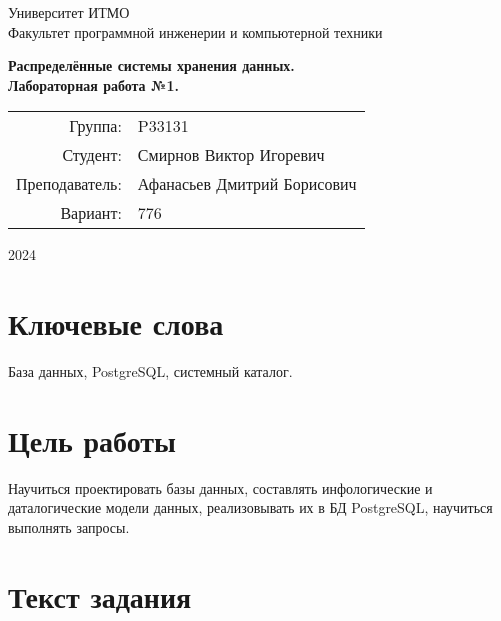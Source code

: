 \documentclass{article}
\begin{document}
\begin{titlepage}
    \begin{center}
        \begin{spacing}{1.4}
            \large{Университет ИТМО} \\
            \large{Факультет программной инженерии и компьютерной техники} \\
        \end{spacing}
        \vfill
        \textbf{
            \huge{Распределённые системы хранения данных.} \\
            \huge{Лабораторная работа №1.} \\
        }
    \end{center}
    \vfill
    \begin{center}
        \begin{tabular}{r l}
            Группа:        & P33131                      \\
            Студент:       & Смирнов Виктор Игоревич     \\
            Преподаватель: & Афанасьев Дмитрий Борисович \\
            Вариант:       & 776                         \\
        \end{tabular}
    \end{center}
    \vfill
    \begin{center}
        \begin{large}
            2024
        \end{large}
    \end{center}
\end{titlepage}

\section*{Ключевые слова}

База данных, PostgreSQL, системный каталог.

\tableofcontents

\section{Цель работы}

Научиться проектировать базы данных, составлять инфологические и даталогические модели данных, реализовывать их в БД PostgreSQL, научиться выполнять запросы.

\section{Текст задания}
\end{document}
